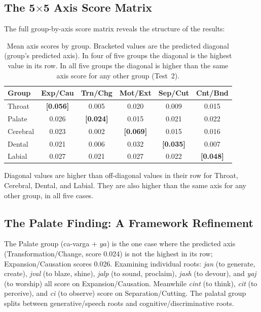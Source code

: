 \documentclass[12pt]{article}
\begin{document}
\subsection{The 5$\times$5 Axis Score Matrix}

The full group-by-axis score matrix reveals the structure of the results:

\begin{table}[htbp]
\centering
\renewcommand{\arraystretch}{1.3}
\begin{tabular}{lccccc}
\toprule
\textbf{Group} & \textbf{Exp/Cau} & \textbf{Trn/Chg} & \textbf{Mot/Ext} & \textbf{Sep/Cut} & \textbf{Cnt/Bnd} \\
\midrule
Throat   & \textbf{[0.056]} & 0.005 & 0.020 & 0.009 & 0.015 \\
Palate   & 0.026 & \textbf{[0.024]} & 0.015 & 0.021 & 0.022 \\
Cerebral & 0.023 & 0.002 & \textbf{[0.069]} & 0.015 & 0.016 \\
Dental   & 0.021 & 0.006 & 0.032 & \textbf{[0.035]} & 0.007 \\
Labial   & 0.027 & 0.021 & 0.027 & 0.022 & \textbf{[0.048]} \\
\bottomrule
\end{tabular}
\caption{Mean axis scores by group. Bracketed values are the predicted diagonal (group's predicted axis). In four of five groups the diagonal is the highest value in its row. In all five groups the diagonal is higher than the same axis score for any other group (Test~2).}
\end{table}

Diagonal values are higher than off-diagonal values in their row for Throat, Cerebral, Dental, and Labial. They are also higher than the same axis for any other group, in all five cases.

\subsection{The Palate Finding: A Framework Refinement}

The Palate group (ca-varga + $ya$) is the one case where the predicted axis (Transformation/Change, score 0.024) is not the highest in its row; Expansion/Causation scores 0.026. Examining individual roots: \textit{jan} (to generate, create), \textit{jval} (to blaze, shine), \textit{jalp} (to sound, proclaim), \textit{jash} (to devour), and \textit{yaj} (to worship) all score on Expansion/Causation. Meanwhile \textit{cint} (to think), \textit{cit} (to perceive), and \textit{ci} (to observe) score on Separation/Cutting. The palatal group splits between generative/speech roots and cognitive/discriminative roots.
\end{document}
